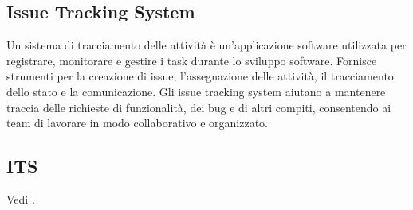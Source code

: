\vspace{2em}
\subsection*{Issue Tracking System}
\par Un sistema di tracciamento delle attività è un'applicazione software utilizzata per registrare, monitorare e gestire i task durante lo sviluppo software. Fornisce strumenti per la creazione di issue, l'assegnazione delle attività, il tracciamento dello stato e la comunicazione. Gli issue tracking system aiutano a mantenere traccia delle richieste di funzionalità, dei bug e di altri compiti, consentendo ai team di lavorare in modo collaborativo e organizzato.

\vspace{2em}
\subsection*{ITS}
\par Vedi .
